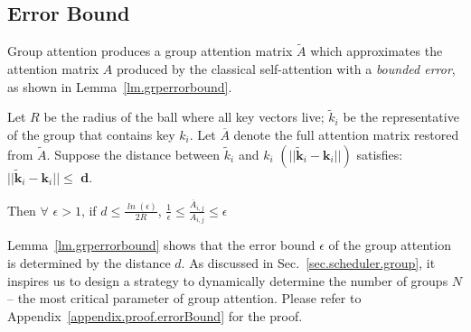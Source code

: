 \begin{sloppypar}

\subsection{Error Bound}
\label{sec.group.error}

Group attention produces a group attention matrix $\widetilde{A}$ which approximates the attention matrix $A$ produced by the classical self-attention with a {\it bounded error}, as shown in Lemma~\ref{lm.grperrorbound}.
\vspace{-1mm}
\begin{lemma}
\label{lm.grperrorbound}
Let $R$ be the radius of the ball where all key vectors live; $\widetilde{k}_i$ be the representative of the group that contains key $k_i$. Let $\overline{A}$ denote the full attention matrix restored from $\widetilde{A}$. Suppose the distance between $\widetilde{k}_i$ and $k_i$ $(||\widetilde{\mathbf{k}}_i-\mathbf{k}_i||)$ satisfies: $||\widetilde{\mathbf{k}}_i-\mathbf{k}_i|| \leq$ {\bf d}.

Then $\forall$ $\epsilon > 1$, if $\mathit{d \leq \frac{\ln(\epsilon)}{2R}}$, $\mathit{\frac{1}{\epsilon} \leq \frac{\overline{A}_{i,j}}{A_{i,j}} \leq \epsilon}$
\end{lemma}

Lemma~\ref{lm.grperrorbound} shows that the error bound $\epsilon$ of the group attention is determined by the distance $d$. 
As discussed in Sec.~\ref{sec.scheduler.group}, it inspires us to design a strategy to dynamically determine the number of groups $N$ -- the most critical parameter of group attention. 
Please refer to Appendix~\ref{appendix.proof.errorBound} for the proof. 

\end{sloppypar}
